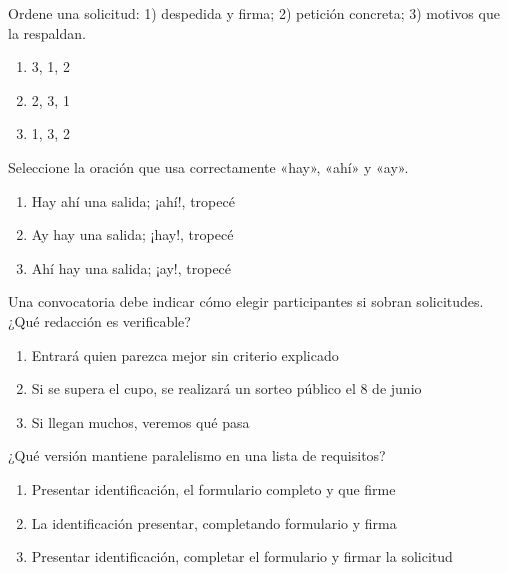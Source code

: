 \noindent\begin{minipage}{\linewidth}\setlength{\parskip}{4pt}\label{q:E-025}
Ordene una solicitud: 1) despedida y firma; 2) petición concreta; 3) motivos que la respaldan.
\begin{enumerate}[label=\Alph*),nosep]
\item 3, 1, 2
\item 2, 3, 1
\item 1, 3, 2
\end{enumerate}\end{minipage}\par\medskip

\noindent\begin{minipage}{\linewidth}\setlength{\parskip}{4pt}\label{q:E-026}
Seleccione la oración que usa correctamente «hay», «ahí» y «ay».
\begin{enumerate}[label=\Alph*),nosep]
\item Hay ahí una salida; ¡ahí!, tropecé
\item Ay hay una salida; ¡hay!, tropecé
\item Ahí hay una salida; ¡ay!, tropecé
\end{enumerate}\end{minipage}\par\medskip

\noindent\begin{minipage}{\linewidth}\setlength{\parskip}{4pt}\label{q:E-027}
Una convocatoria debe indicar cómo elegir participantes si sobran solicitudes. ¿Qué redacción es verificable?
\begin{enumerate}[label=\Alph*),nosep]
\item Entrará quien parezca mejor sin criterio explicado
\item Si se supera el cupo, se realizará un sorteo público el 8 de junio
\item Si llegan muchos, veremos qué pasa
\end{enumerate}\end{minipage}\par\medskip

\noindent\begin{minipage}{\linewidth}\setlength{\parskip}{4pt}\label{q:E-028}
¿Qué versión mantiene paralelismo en una lista de requisitos?
\begin{enumerate}[label=\Alph*),nosep]
\item Presentar identificación, el formulario completo y que firme
\item La identificación presentar, completando formulario y firma
\item Presentar identificación, completar el formulario y firmar la solicitud
\end{enumerate}\end{minipage}\par\medskip

